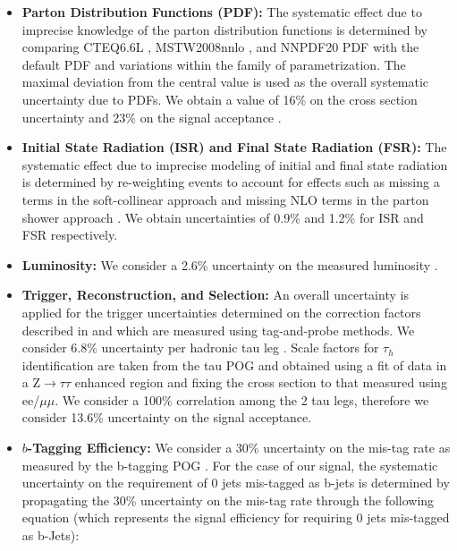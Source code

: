 \begin{itemize}
	\item \textbf{Parton Distribution Functions (PDF):} The systematic effect due to imprecise knowledge of the parton distribution functions is determined by comparing CTEQ6.6L \cite{Nadolsky:2008zw}, MSTW2008nnlo \cite{Martin:2009iq}, and NNPDF20 PDF \cite{Ubiali:2008uk} with the default PDF and variations within the family of parametrization. The maximal deviation from the central value is used as the overall systematic uncertainty due to PDFs. We obtain a value of 16\% on the cross section uncertainty and 23\% on the signal acceptance \cite{Botje:2011sn}.
	
	\item \textbf{Initial State Radiation (ISR) and Final State Radiation (FSR):} The systematic effect due to imprecise modeling of initial and final state radiation is determined by re-weighting events to account for effects such as missing a terms in the soft-collinear approach \cite{Nanava:2003cg} and missing NLO terms in the parton shower approach \cite{Miu:1998ju}. We obtain uncertainties of 0.9\% and 1.2\% for ISR and FSR respectively.
	
	\item \textbf{Luminosity:} We consider a 2.6\% uncertainty on the measured luminosity \cite{CMS:2012rua}.
	
	\item \textbf{Trigger, Reconstruction, and Selection:}  An overall uncertainty is applied for the trigger uncertainties determined on the correction factors described in \cite{bib:AN-12-321} and which are measured using tag-and-probe methods. We consider 6.8\% uncertainty per hadronic tau leg \cite{CMS:2011msa}. Scale factors for $\tau_{h}$ identification are taken from the tau POG and obtained using a fit of data in a Z$\to\tau\tau$ enhanced region and fixing the cross section to that measured using ee/$\mu\mu$. We consider a 100\% correlation among the 2 tau legs, therefore we consider 13.6\% uncertainty on the signal acceptance.
	
	\item \textbf{$b$-Tagging Efficiency:} We consider a 30\% uncertainty on the mis-tag rate as measured by the b-tagging POG \cite{CMS:2011cra}. For the case of our signal, the systematic uncertainty on the requirement of 0 jets mis-tagged as b-jets is determined by propagating the 30\% uncertainty on the mis-tag rate through the following equation (which represents the signal efficiency for requiring 0 jets mis-tagged as b-Jets):
	

\end{itemize}
